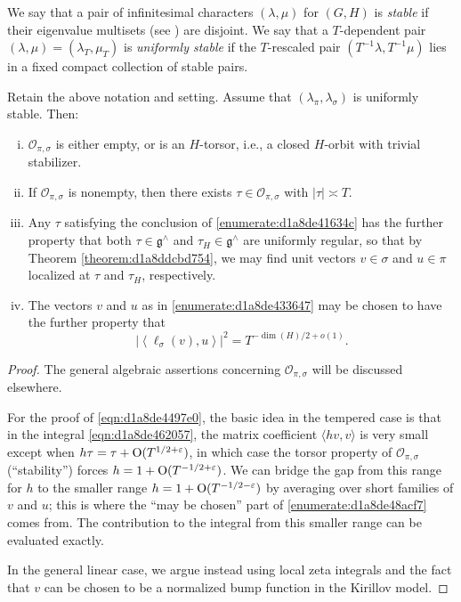 \documentclass[reqno]{amsart} 
\numberwithin{equation}{section}
\numberwithin{theorem}{section}
\begin{document}
\begin{definition}
  We say that a pair of infinitesimal characters $(\lambda,\mu)$ for $(G,H)$ is \emph{stable} if their eigenvalue multisets (see \cite[\S13.4.1]{nelson-venkatesh-1}) are disjoint.  We say that a $T$-dependent pair $(\lambda,\mu) = (\lambda_T, \mu_T)$ is \emph{uniformly stable} if the $T$-rescaled pair $(T^{-1} \lambda, T^{-1} \mu)$ lies in a fixed compact collection of stable pairs.
\end{definition}

\begin{theorem}
  Retain the above notation and setting.  Assume that $(\lambda_\pi, \lambda_\sigma)$ is uniformly stable.  Then:
  \begin{enumerate}[(i)]
  \item $\mathcal{O}_{\pi,\sigma}$ is either empty, or is an $H$-torsor, i.e., a closed $H$-orbit with trivial stabilizer.
  \item\label{enumerate:d1a8de41634c} If $\mathcal{O}_{\pi,\sigma}$ is nonempty, then there exists $\tau \in \mathcal{O}_{\pi,\sigma}$ with $\lvert \tau \rvert \asymp T$.
  \item\label{enumerate:d1a8de433647} Any $\tau$ satisfying the conclusion of \eqref{enumerate:d1a8de41634c} has the further property that both $\tau \in \mathfrak{g}^\wedge$ and $\tau_H \in \mathfrak{g}^\wedge$ are uniformly regular, so that by Theorem \ref{theorem:d1a8ddcbd754}, we may find unit vectors $v \in \sigma$ and $u \in \pi$ localized at $\tau$ and $\tau_H$, respectively.
  \item\label{enumerate:d1a8de48acf7} The vectors $v$ and $u$ as in \eqref{enumerate:d1a8de433647} may be chosen to have the further property that
\begin{equation}\label{eqn:d1a8de4497e0}
\left\lvert \left\langle \ell_\sigma(v), u \right\rangle \right\rvert^2 = T^{-\dim(H)/2 + o(1)}.
\end{equation}    
  \end{enumerate}
\end{theorem}
\begin{proof}
  The general algebraic assertions concerning $\mathcal{O}_{\pi,\sigma}$ will be discussed elsewhere.

  For the proof of \eqref{eqn:d1a8de4497e0}, the basic idea in the tempered case is that in the integral \eqref{eqn:d1a8de462057}, the matrix coefficient $\langle h v, v \rangle$ is very small except when $h \tau = \tau + \operatorname{O}(T^{1/2+\varepsilon})$, in which case the torsor property of $\mathcal{O}_{\pi,\sigma}$ (``stability'') forces $h = 1 + \operatorname{O}(T^{-1/2+\varepsilon})$.  We can bridge the gap from this range for $h$ to the smaller range $h = 1 + \operatorname{O}(T^{-1/2-\varepsilon})$ by averaging over short families of $v$ and $u$; this is where the ``may be chosen'' part of \eqref{enumerate:d1a8de48acf7} comes from.  The contribution to the integral from this smaller range can be evaluated exactly.

  In the general linear case, we argue instead using local zeta integrals and the fact that $v$ can be chosen to be a normalized bump function in the Kirillov model.
\end{proof}





{} 
\end{document}
